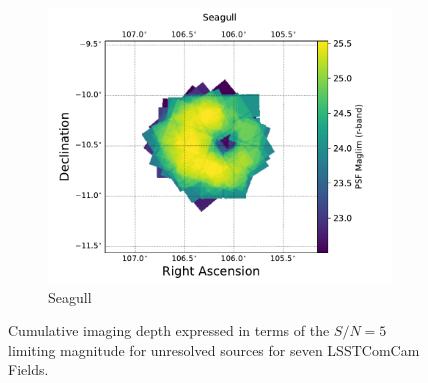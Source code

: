 \begin{figure}[htbp]
    \hfill
    \begin{subfigure}[b]{0.3\textwidth}
        \centering
        \includegraphics[width=\textwidth]{comcam_psf_maglim_seagull_r}
        \caption{Seagull}
        \label{fig:img8}
    \end{subfigure}
     \caption{Cumulative imaging depth expressed in terms of the $S/N=5$ limiting magnitude for unresolved sources for seven LSSTComCam Fields.}
     \label{fig:dp1_fields_psf_maglim}
\end{figure}
